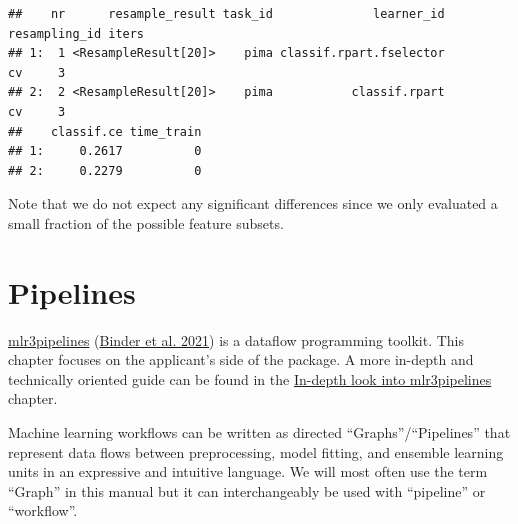\documentclass[
]{scrbook}
\newenvironment{Shaded}{\begin{snugshade}}{\end{snugshade}}
\newcommand{\AttributeTok}[1]{\textcolor[rgb]{0.77,0.63,0.00}{#1}}
\newcommand{\ConstantTok}[1]{\textcolor[rgb]{0.00,0.00,0.00}{#1}}
\newcommand{\DecValTok}[1]{\textcolor[rgb]{0.00,0.00,0.81}{#1}}
\newcommand{\FunctionTok}[1]{\textcolor[rgb]{0.00,0.00,0.00}{#1}}
\newcommand{\NormalTok}[1]{#1}
\newcommand{\OtherTok}[1]{\textcolor[rgb]{0.56,0.35,0.01}{#1}}
\newcommand{\SpecialCharTok}[1]{\textcolor[rgb]{0.00,0.00,0.00}{#1}}
\newcommand{\StringTok}[1]{\textcolor[rgb]{0.31,0.60,0.02}{#1}}
\renewenvironment{Shaded} {\begin{snugshade}\small} {\end{snugshade}}
\begin{document}
\begin{Shaded}
\end{Shaded}

\begin{verbatim}
##    nr      resample_result task_id              learner_id resampling_id iters
## 1:  1 <ResampleResult[20]>    pima classif.rpart.fselector            cv     3
## 2:  2 <ResampleResult[20]>    pima           classif.rpart            cv     3
##    classif.ce time_train
## 1:     0.2617          0
## 2:     0.2279          0
\end{verbatim}

Note that we do not expect any significant differences since we only evaluated a small fraction of the possible feature subsets.

\hypertarget{pipelines}{%
\chapter{Pipelines}\label{pipelines}}

\href{https://mlr3pipelines.mlr-org.com}{mlr3pipelines} (\protect\hyperlink{ref-mlr3pipelines}{Binder et al. 2021}) is a dataflow programming toolkit.
This chapter focuses on the applicant's side of the package.
A more in-depth and technically oriented guide can be found in the \protect\hyperlink{in-depth-pipelines}{In-depth look into mlr3pipelines} chapter.

Machine learning workflows can be written as directed ``Graphs''/``Pipelines'' that represent data flows between preprocessing, model fitting, and ensemble learning units in an expressive and intuitive language.
We will most often use the term ``Graph'' in this manual but it can interchangeably be used with ``pipeline'' or ``workflow''.
\end{document}
